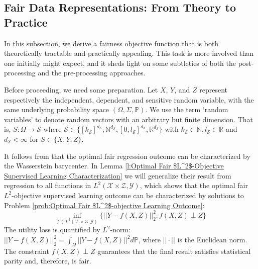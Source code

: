 \documentclass[twoside,11pt]{article}
\newcommand{\edit}[1]{\textcolor{blue}{#1}}
\begin{document}
\subsection{Fair Data Representations: From Theory to Practice}  \label{s:Post-processing and Pre-processing Approach}


In this subsection, we derive a fairness objective function that is both theoretically tractable and practically appealing.  This task is more involved than one initially might expect, and it sheds light on some subtleties of both the post-processing and the pre-processing approaches. 

Before proceeding, we need some preparation.
Let $X$, $Y$, and $Z$ represent respectively the independent, dependent, and sensitive random variable, with the same underlying probability space $(\Omega,\Sigma,\mathbb{P})$.  We use the term `random variables' to denote random vectors with an arbitrary but finite dimension. That is, $S: \Omega \rightarrow \mathcal{S}$ where $\mathcal{S} \in \{[k_\mathcal{S} ]^{d_{\mathcal{S}}}, \mathbb{N}^{d_{\mathcal{S}}}, [0,l_\mathcal{S} ]^{d_{\mathcal{S}}}, \mathbb{R}^{d_{\mathcal{S}}}\}$ with $k_\mathcal{S} \in \mathbb{N}, l_\mathcal{S}  \in \mathbb{R}$ and $d_{\mathcal{S}} < \infty$ for $S \in \{X,Y,Z\}$.

It follows from \cite{chzhen2020fair, gouic2020projection} that the optimal fair regression outcome can be characterized by the Wasserstein barycenter. In Lemma \ref{l:Optimal Fair $L^2$-Objective Supervised Learning Characterization} we will generalize their result from regression to all functions in $L^2(\mathcal{X} \times \mathcal{Z},\mathcal{Y})$, which shows that the optimal fair $L^2$-objective supervised learning outcome can be characterized by solutions to Problem \ref{prob:Optimal Fair $L^2$-objective Learning Outcome}:
\begin{equation}
\inf_{f \in L^2(\mathcal{X} \times \mathcal{Z},\mathcal{Y})} \{||Y - f(X,Z)||_2^2 : f(X,Z) \perp Z\}
\end{equation}
The utility loss is quantified by $L^2$-norm: $||Y - f(X,Z)||_2^2 = \int_{\Omega} ||Y - f(X,Z)||^2 d\mathbb{P}$, where $||\cdot||$ is the Euclidean norm. The constraint $f(X,Z) \perp Z$ guarantees that the final result satisfies statistical parity and, therefore, is fair. 
\end{document}
